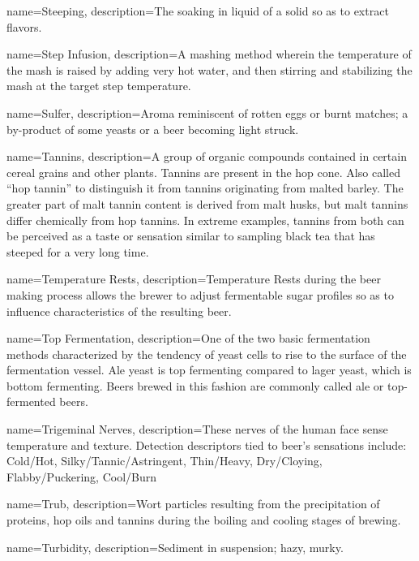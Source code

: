 {
  name={Steeping},
  description={The soaking in liquid of a solid so as to extract flavors.}
  }

{
  name={Step Infusion},
  description={A mashing method wherein the temperature of the mash is raised by adding very hot water, and then stirring and stabilizing the mash at the target step temperature.}
  }

{
  name={Sulfer},
  description={Aroma reminiscent of rotten eggs or burnt matches; a by-product of some yeasts or a beer becoming light struck.}
  }

{
  name={Tannins},
  description={A group of organic compounds contained in certain cereal grains and other plants. Tannins are present in the hop cone. Also called “hop tannin” to distinguish it from tannins originating from malted barley. The greater part of malt tannin content is derived from malt husks, but malt tannins differ chemically from hop tannins. In extreme examples, tannins from both can be perceived as a taste or sensation similar to sampling black tea that has steeped for a very long time.}
  }

{
  name={Temperature Rests},
  description={Temperature Rests during the beer making process allows the brewer to adjust fermentable sugar profiles so as to influence characteristics of the resulting beer.}
  }

{
  name={Top Fermentation},
  description={One of the two basic fermentation methods characterized by the tendency of yeast cells to rise to the surface of the fermentation vessel. Ale yeast is top fermenting compared to lager yeast, which is bottom fermenting. Beers brewed in this fashion are commonly called ale or top-fermented beers.}
  }

{
  name={Trigeminal Nerves},
  description={These nerves of the human face sense temperature and texture. Detection descriptors tied to beer’s sensations include: Cold/Hot, Silky/Tannic/Astringent, Thin/Heavy, Dry/Cloying, Flabby/Puckering, Cool/Burn}
  }

{
  name={Trub},
  description={Wort particles resulting from the precipitation of proteins, hop oils and tannins during the boiling and cooling stages of brewing.}
  }

{
  name=Turbidity,
  description={Sediment in suspension; hazy, murky.}
  }

